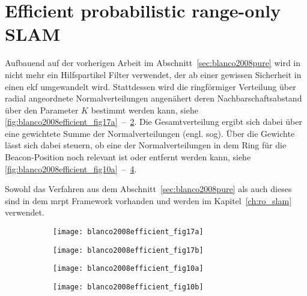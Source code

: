%
%
\section{Efficient probabilistic range-only SLAM}\label{sec:blanco2008efficient}

Aufbauend auf der vorherigen Arbeit im Abschnitt~\ref{sec:blanco2008pure} wird in  \cite{blanco2008efficient} nicht mehr ein Hilfspartikel Filter verwendet, der ab einer gewissen Sicherheit in einen \Gls{ekf} umgewandelt wird. Stattdessen wird die ringförmiger Verteilung über radial angeordnete Normalverteilungen angenähert deren Nachbarschaftsabstand über den Parameter $K$ bestimmt werden kann, siehe \autoref{fig:blanco2008efficient_fig17a}~--~\ref{fig:blanco2008efficient_fig17b}. Die Gesamtverteilung ergibt sich dabei über eine gewichtete Summe der Normalverteilungen (engl. \gls{sog}). Über die Gewichte lässt sich dabei steuern, ob eine der Normalverteilungen in dem Ring für die Beacon-Position noch relevant ist oder entfernt werden kann, siehe \autoref{fig:blanco2008efficient_fig10a}~--~\ref{fig:blanco2008efficient_fig10b}.

Sowohl das Verfahren aus dem Abschnitt~\ref{sec:blanco2008pure} als auch dieses sind in dem \Gls{mrpt} Framework vorhanden und werden im Kapitel~\ref{ch:ro_slam} verwendet.

\begin{figure}
	\begin{subfigure}[t]{0.24\linewidth}
		\texttt{[image: blanco2008efficient\_fig17a]}
		\caption{}
		\label{fig:blanco2008efficient_fig17a}
	\end{subfigure}
	\hfill
	\begin{subfigure}[t]{0.24\linewidth}
		\texttt{[image: blanco2008efficient\_fig17b]}
		\caption{}
		\label{fig:blanco2008efficient_fig17b}
	\end{subfigure}
	\hfill
	\begin{subfigure}[t]{0.24\linewidth}
		\texttt{[image: blanco2008efficient\_fig10a]}
		\caption{}
		\label{fig:blanco2008efficient_fig10a}
	\end{subfigure}
	\hfill
	\begin{subfigure}[t]{0.24\linewidth}
		\texttt{[image: blanco2008efficient\_fig10b]}
		\caption{}
		\label{fig:blanco2008efficient_fig10b}
	\end{subfigure}
	\label{fig:blanco2008efficient}
\end{figure}


